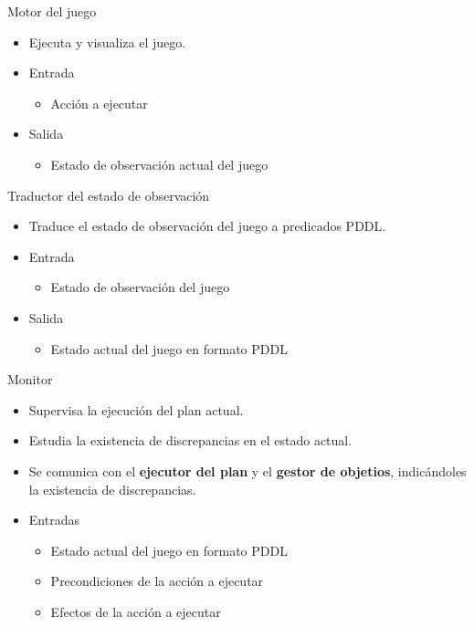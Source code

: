 \documentclass[11pt]{beamer}    %
\begin{document}
    \begin{frame}{Motor del juego}
        \begin{itemize}
            \item Ejecuta y visualiza el juego.
            \item \alert{Entrada}
            \begin{itemize}
                \item Acción a ejecutar
            \end{itemize}
            \item \alert{Salida}
            \begin{itemize}
                \item Estado de observación actual del juego
            \end{itemize}
        \end{itemize}
    \end{frame}
    
    \begin{frame}{Traductor del estado de observación}
        \begin{itemize}
            \item Traduce el estado de observación del juego a predicados PDDL.
            \item \alert{Entrada}
            \begin{itemize}
                \item Estado de observación del juego
            \end{itemize}
            \item \alert{Salida}
            \begin{itemize}
                \item Estado actual del juego en formato PDDL
            \end{itemize}
        \end{itemize}
    \end{frame}

    \begin{frame}{Monitor}
        \begin{itemize}
            \item Supervisa la ejecución del plan actual.
            \item Estudia la existencia de \alert{discrepancias} en el estado actual.
            \item Se comunica con el \textbf{ejecutor del plan} y el \textbf{gestor de objetios},
            indicándoles la existencia de discrepancias.
            \item \alert{Entradas}
            \begin{itemize}
                \item Estado actual del juego en formato PDDL
                \item Precondiciones de la acción a ejecutar
                \item Efectos de la acción a ejecutar
            \end{itemize}
        \end{itemize}

    \end{frame}
\end{document}
